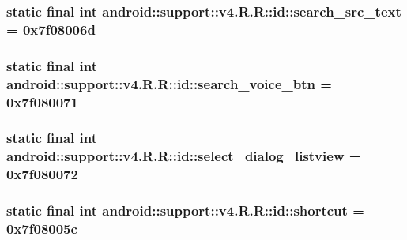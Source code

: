 \hypertarget{classandroid_1_1support_1_1v4_1_1_r_1_1id_5063c9c248e07dd7e23a66459be93cf2}{
\subsubsection[{search\_\-src\_\-text}]{\setlength{\rightskip}{0pt plus 5cm}static final int android::support::v4.R.R::id::search\_\-src\_\-text = 0x7f08006d}}
\label{classandroid_1_1support_1_1v4_1_1_r_1_1id_5063c9c248e07dd7e23a66459be93cf2}


\hypertarget{classandroid_1_1support_1_1v4_1_1_r_1_1id_2358715ec1f591e70681e772ae80d817}{
\subsubsection[{search\_\-voice\_\-btn}]{\setlength{\rightskip}{0pt plus 5cm}static final int android::support::v4.R.R::id::search\_\-voice\_\-btn = 0x7f080071}}
\label{classandroid_1_1support_1_1v4_1_1_r_1_1id_2358715ec1f591e70681e772ae80d817}


\hypertarget{classandroid_1_1support_1_1v4_1_1_r_1_1id_0a2ad4eeaf7e94915f66560422c47e62}{
\subsubsection[{select\_\-dialog\_\-listview}]{\setlength{\rightskip}{0pt plus 5cm}static final int android::support::v4.R.R::id::select\_\-dialog\_\-listview = 0x7f080072}}
\label{classandroid_1_1support_1_1v4_1_1_r_1_1id_0a2ad4eeaf7e94915f66560422c47e62}


\hypertarget{classandroid_1_1support_1_1v4_1_1_r_1_1id_420b059bf4021449cf52c595931ed740}{
\subsubsection[{shortcut}]{\setlength{\rightskip}{0pt plus 5cm}static final int android::support::v4.R.R::id::shortcut = 0x7f08005c}}
\label{classandroid_1_1support_1_1v4_1_1_r_1_1id_420b059bf4021449cf52c595931ed740}


